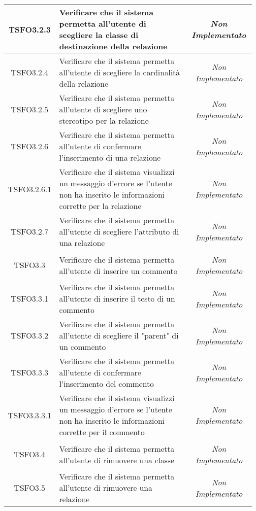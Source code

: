 \begin{longtable}{|c|>{}m{8cm}|c|}
\hypertarget{TSFO3.2.3}{TSFO3.2.3} & Verificare che il sistema permetta all'utente di scegliere la classe di destinazione della relazione & \textit{Non Implementato}\\ \hline
\hypertarget{TSFO3.2.4}{TSFO3.2.4} & Verificare che il sistema permetta all'utente di scegliere la cardinalità della relazione & \textit{Non Implementato}\\ \hline
\hypertarget{TSFO3.2.5}{TSFO3.2.5} & Verificare che il sistema permetta all'utente di scegliere uno stereotipo per la relazione & \textit{Non Implementato}\\ \hline
\hypertarget{TSFO3.2.6}{TSFO3.2.6} & Verificare che il sistema permetta all'utente di confermare l'inserimento di una relazione & \textit{Non Implementato}\\ \hline
\hypertarget{TSFO3.2.6.1}{TSFO3.2.6.1} & Verificare che il sistema visualizzi un messaggio d'errore se l'utente non ha inserito le informazioni corrette per la relazione & \textit{Non Implementato}\\ \hline
\hypertarget{TSFO3.2.7}{TSFO3.2.7} & Verificare che il sistema permetta all'utente di scegliere l'attributo di una relazione & \textit{Non Implementato}\\ \hline
\hypertarget{TSFO3.3}{TSFO3.3} & Verificare che il sistema permetta all'utente di inserire un commento & \textit{Non Implementato}\\ \hline
\hypertarget{TSFO3.3.1}{TSFO3.3.1} & Verificare che il sistema permetta all'utente di inserire il testo di un commento & \textit{Non Implementato}\\ \hline
\hypertarget{TSFO3.3.2}{TSFO3.3.2} & Verificare che il sistema permetta all'utente di scegliere il "parent" di un commento & \textit{Non Implementato}\\ \hline
\hypertarget{TSFO3.3.3}{TSFO3.3.3} & Verificare che il sistema permetta all'utente di confermare l'inserimento del commento & \textit{Non Implementato}\\ \hline
\hypertarget{TSFO3.3.3.1}{TSFO3.3.3.1} & Verificare che il sistema visualizzi un messaggio d'errore se l'utente non ha inserito le informazioni corrette per il commento & \textit{Non Implementato}\\ \hline
\hypertarget{TSFO3.4}{TSFO3.4} & Verificare che il sistema permetta all'utente di rimuovere una classe & \textit{Non Implementato}\\ \hline
\hypertarget{TSFO3.5}{TSFO3.5} & Verificare che il sistema permetta all'utente di rimuovere una relazione & \textit{Non Implementato}\\ \hline

\end{longtable}
